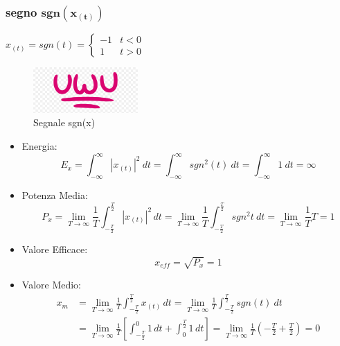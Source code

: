         \subsubsection{segno $\mathbf{sgn(x_{(t)})}$}
        $x_{(t)} = sgn(t) =
            \begin{cases}
                -1 & t < 0\\
                1  & t>0 
            \end{cases}
        $
        \begin{figure}[H]
            \centering
            \includegraphics[width=4cm]{media/uwu.png}
            \caption{Segnale sgn(x)}
            \label{fig:segnale sgn(x)}
        \end{figure}
        \begin{itemize}
            \item {Energia:
                \[
                    E_{x} = \int_{-\infty}^{\infty} |x_{(t)}|^2 \ dt = \int_{-\infty}^{\infty} sgn^2(t)\ dt = \int_{-\infty}^{\infty} 1\ dt =\infty 
                \]
            }
            \item {Potenza Media:
                \[
                    P_{x} =\lim_{T\rightarrow\infty}  \frac{1}{T} \int_{-\frac{T}{2}}^{\frac{T}{2}}  |x_{(t)}|^2 \,dt =\lim_{T\rightarrow\infty} \frac{1}{T} \int_{-\frac{T}{2}}^{\frac{T}{2}} sgn^2{t}\ dt = \lim_{T\rightarrow\infty} \frac{1}{T} T = 1
                \]
            }
            \item {Valore Efficace:
                \[
                    x_{eff} = \sqrt{P_{x}} = 1 
                \]
            }
            \item {Valore Medio:
                \begin{align}
                    x_{m} & = \lim_{T\rightarrow\infty} \frac{1}{T} \int_{-\frac{T}{2}}^{\frac{T}{2}}  x_{(t)} \,dt =\lim_{T\rightarrow\infty} \frac{1}{T} \int_{-\frac{T}{2}}^{\frac{T}{2}} sgn(t)\ dt \nonumber \\
                          & = \lim_{T\rightarrow\infty} \frac{1}{T} \left[\int_{-\frac{T}{2}}^{0}  1\,dt + \int_{0}^{\frac{T}{2}}  1\,dt\right] = \lim_{T\rightarrow\infty} \frac{1}{T} \left(-\frac{T}{2}+\frac{T}{2}\right) = 0 \nonumber
                \end{align}        
            }
        \end{itemize}
        
